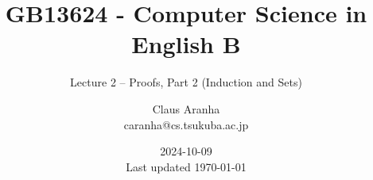 \documentclass[aspectratio=169]{beamer}
\title[GB13624]{GB13624 - Computer Science in English B}
\subtitle[]{Lecture 2 -- Proofs, Part 2 (Induction and Sets)}
\author[Claus Aranha]{Claus Aranha\\{\footnotesize caranha@cs.tsukuba.ac.jp}}
\institute[COINS]{College of Information Science}
\date[2024-10-09]{2024-10-09\\{\tiny Last updated \today}}
\begin{document}
\begin{frame}
  \maketitle
\end{frame}







\end{document}
